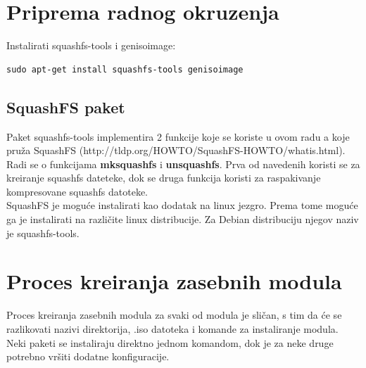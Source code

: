 \documentclass[12pt,vi]{mitthesis}
\begin{document}
\chapter*{Priprema radnog okruzenja}
Instalirati squashfs-tools i genisoimage:
\begin{lstlisting}[style=BashInputStyle]
sudo apt-get install squashfs-tools genisoimage
\end{lstlisting}

\section*{SquashFS paket}
Paket squashfs-tools implementira 2 funkcije koje se koriste u ovom radu a koje pruža SquashFS (http://tldp.org/HOWTO/SquashFS-HOWTO/whatis.html).
Radi se o funkcijama \textbf{mksquashfs} i \textbf{unsquashfs}. Prva od navedenih koristi se za kreiranje squashfs dateteke, dok se druga funkcija koristi za raspakivanje kompresovane squashfs datoteke.\\
SquashFS je moguće instalirati kao dodatak na linux jezgro. Prema tome moguće ga je instalirati na različite linux distribucije. Za Debian distribuciju njegov naziv je squashfs-tools.

\chapter*{Proces kreiranja zasebnih modula}
\indent
Proces kreiranja zasebnih modula za svaki od modula je sličan, s tim da će se razlikovati nazivi direktorija, .iso datoteka i komande za instaliranje modula. Neki paketi se instaliraju direktno jednom komandom, dok je za neke druge potrebno vršiti dodatne konfiguracije.
\end{document}

